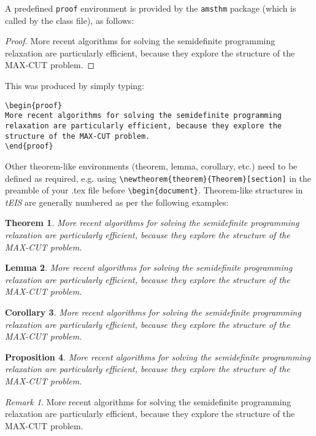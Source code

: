 \documentclass[]{tEIS2e}
\theoremstyle{plain}
\newtheorem{theorem}{Theorem}[section]
\newtheorem{lemma}[theorem]{Lemma}
\newtheorem{corollary}[theorem]{Corollary}
\newtheorem{proposition}[theorem]{Proposition}
\theoremstyle{remark}
\newtheorem{remark}{Remark}
\begin{document}
A predefined \verb"proof" environment is provided by the \verb"amsthm" package (which is called by the class file), as follows:

\begin{proof}
More recent algorithms for solving the semidefinite programming
relaxation are particularly efficient, because they explore the
structure of the MAX-CUT problem.
\end{proof}
\noindent This was produced by simply typing:
%
\begin{verbatim}
\begin{proof}
More recent algorithms for solving the semidefinite programming
relaxation are particularly efficient, because they explore the
structure of the MAX-CUT problem.
\end{proof}
\end{verbatim}
%
Other theorem-like environments (theorem, lemma, corollary, etc.) need to be defined as required, e.g. using \verb"\newtheorem{theorem}{Theorem}[section]"
in the preamble of your .tex file before \verb"\begin{document}". Theorem-like structures in \textit{tEIS} are generally numbered as per the following examples:

\begin{theorem}
More recent algorithms for solving the semidefinite programming
relaxation are particularly efficient, because they explore the structure
of the MAX-CUT problem.
\end{theorem}
\begin{lemma}
More recent algorithms for solving the semidefinite programming
relaxation are particularly efficient, because they explore the structure
of the MAX-CUT problem.
\end{lemma}
\begin{corollary}
More recent algorithms for solving the semidefinite programming
relaxation are particularly efficient, because they explore the
structure of the MAX-CUT problem.
\end{corollary}
\begin{proposition}
More recent algorithms for solving the semidefinite programming
relaxation are particularly efficient, because they explore the
structure of the MAX-CUT problem.
\end{proposition}
\begin{remark}
More recent algorithms for solving the semidefinite programming
relaxation are particularly efficient, because they explore the
structure of the MAX-CUT problem.
\end{remark}
\end{document}
